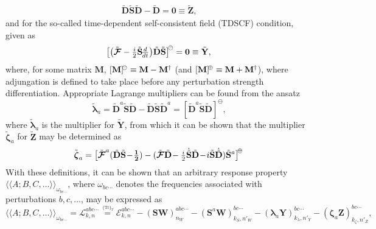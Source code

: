 \documentclass[%
 reprint,
 amsmath,amssymb,
 aps,
]{revtex4-1}
\begin{document}
\begin{eqnarray}\label{idempotency}
\tilde{\mathbf{D}} \tilde{\mathbf{S}} \tilde{\mathbf{D}} - \tilde{\mathbf{D}} = \mathbf{0} \equiv \tilde{\mathbf{Z}}
\text{,}
\end{eqnarray}
and for the so-called time-dependent self-consistent field (TDSCF) condition, given as
\begin{eqnarray}\label{TDSCF}
\bigr[\bigl(\tilde{\mbox{\boldmath $ \mathcal{F} $}} - {\textstyle \frac{i}{2}} \tilde{\mathbf{S}} 
\!{\textstyle \frac{d}{dt}} \bigr) \tilde{\mathbf{D}} \tilde{\mathbf{S}} \bigr]^{\negmedspace\circleddash} = \mathbf{0} \equiv \tilde{\mathbf{Y}}
\text{,}
\end{eqnarray}
where, for some matrix $\mathbf{M}$, $[\mathbf{M}]^{\negmedspace\circleddash} \equiv \mathbf{M} - \mathbf{M}^{\dagger}$ (and $[\mathbf{M}]^{\negmedspace\oplus} \equiv \mathbf{M} + \mathbf{M}^{\dagger}$), where adjungation is defined to take place before any perturbation  strength differentiation. 
Appropriate Lagrange multipliers can be found from the ansatz
\begin{equation}
\tilde{\bm{\lambda}}_a = \tilde{\mathbf{D}}^{a}\tilde{\mathbf{S}} \tilde{\mathbf{D}}-\tilde{\mathbf{D}} \tilde{\mathbf{S}} \tilde{\mathbf{D}}^{a}=[\tilde{\mathbf{D}}^{a}\tilde{\mathbf{S}} \tilde{\mathbf{D}}]^{\!\ominus} \label{LagrMulXg} \text{,}
\end{equation}
where $\tilde{\bm{\lambda}}_{a}$ is the multiplier for $\tilde{\mathbf{Y}}$, from which it can be shown  that the multiplier $\tilde{\bm{\zeta}}_a$ for $\tilde{\mathbf{Z}}$ may be determined as
\begin{equation}
\tilde{\mbox{\boldmath $ \zeta $}}_a=\bigl[\tilde{\mbox{\boldmath $ \mathcal{F} $}}^{a}(\tilde{\mathbf{D}} \tilde{\mathbf{S}}\!-\!{\textstyle \mathbf{\frac{1}{2}}})-(\tilde{\mbox{\boldmath $ \mathcal{F} $}} \tilde{\mathbf{D}}\!-{\textstyle \frac{i}{2}}\dot{\tilde{\mathbf{S}}} \tilde{\mathbf{D}}
\!-\! i\tilde{\mathbf{S}} \dot{\tilde{\mathbf{D}}})\tilde{\mathbf{S}}^{a}\bigr]^{\negmedspace\oplus}\label{LagrMulLg}
\end{equation}
With these definitions, it can be shown  that an arbitrary response property $\langle \langle A ; B, C, \ldots \rangle \rangle_{\omega_{bc\cdots}}$, where $\omega_{bc\cdots}$ denotes the frequencies associated with perturbations $b, c, \ldots$, may be expressed as
\begin{equation}\label{master}
\langle \langle A ; B, C, \ldots \rangle \rangle_{\omega_{bc\cdots}} = \mathcal{L}_{k,n}^{abc\cdots} \stackrel{\,^{\{\mathrm{Tr}\}_T}}{=} \mathcal{E}_{k,n}^{abc\cdots} - (\mathbf{SW})_{n_{W}}^{abc\cdots} - (\mathbf{S}^{a}\mathbf{W})_{k_{S},n'_{W}}^{bc\cdots} - (\mathbf{\lambda}_{a}\mathbf{Y})_{k_{\lambda},n'_{Y}}^{bc\cdots} - (\mathbf{\zeta}_{a}\mathbf{Z})_{k_{\zeta},n'_{Z}}^{bc\cdots}\text{,}
\end{equation}
\end{document}
